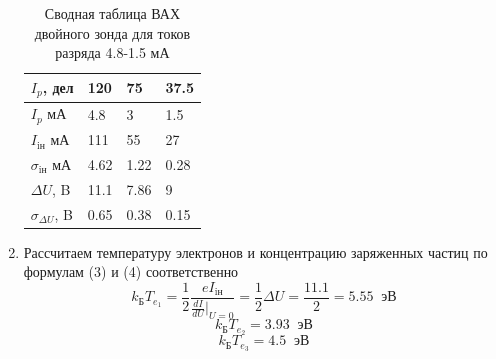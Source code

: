 \documentclass[a4paper,12pt]{article}
\begin{document}
\begin{enumerate}
\begin{table}[h!]
\centering
\begin{tabular}{|l||l|l|l|}
\hline
$I_p$, дел              & 120  & 75   & 37.5 \\ \hline
$I_p$ мА                & 4.8  & 3    & 1.5  \\ \hline
$I_{\text{iн}}$ мА      & 111  & 55   & 27   \\ \hline
$\sigma_{\text{iн}}$ мА & 4.62 & 1.22 & 0.28 \\ \hline
$\Delta U$, B           & 11.1 & 7.86 & 9    \\ \hline
$\sigma_{\Delta U}$, B  & 0.65 & 0.38 & 0.15 \\ \hline
\end{tabular}
\caption{Сводная таблица ВАХ двойного зонда для токов разряда 4.8-1.5 мА}
\end{table}
\item Рассчитаем температуру электронов и концентрацию заряженных частиц по формулам (3) и (4) соответственно
\[k_{\text{Б}}T_{e_1} = \frac{1}{2}\frac{eI_{\text{iн}}}{\frac{dI}{dU}|_{U=0}} = \frac{1}{2}\Delta U = \frac{11.1}{2} = 5.55 \;\; \text{эВ}\]
\[k_{\text{Б}}T_{e_2} = 3.93 \;\; \text{эВ}\]
\[k_{\text{Б}}T_{e_3} = 4.5 \;\; \text{эВ}\]


\end{enumerate}
\end{document}

